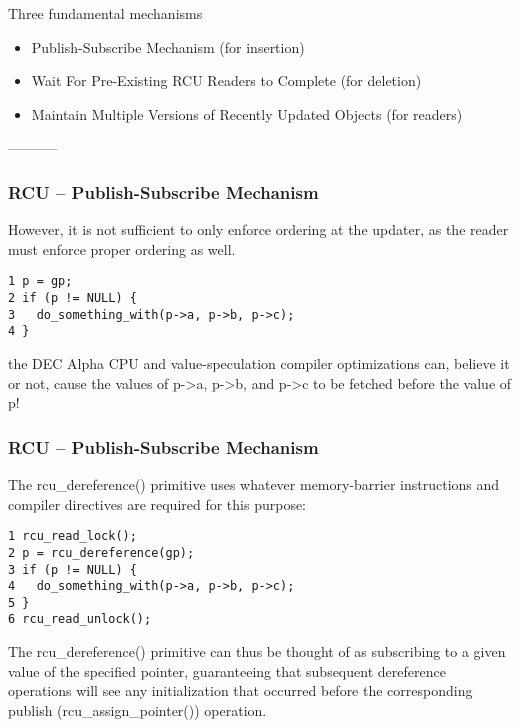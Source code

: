 Three fundamental mechanisms
\begin{itemize}
    \item  Publish-Subscribe Mechanism (for insertion) 
    \item  Wait For Pre-Existing RCU Readers to Complete (for deletion) 
    \item Maintain Multiple Versions of Recently Updated Objects (for readers) 
\end{itemize}-----------
\begin{frame}[fragile]
    \frametitle{RCU -- Publish-Subscribe Mechanism}
    \Large
    However, it is not sufficient to only enforce ordering at the updater, as the reader must enforce proper ordering as well.
    
    \small
    \begin{block}{}
        \begin{verbatim}
1 p = gp;
2 if (p != NULL) {
3   do_something_with(p->a, p->b, p->c);
4 }
        \end{verbatim}
    \end{block}  

\Large
the DEC Alpha CPU and value-speculation compiler optimizations can, believe it or not, cause the values of p->a, p->b, and p->c to be fetched before the value of p!
\end{frame}


\begin{frame}[fragile]
    \frametitle{RCU -- Publish-Subscribe Mechanism}
    \Large
    The rcu\_dereference() primitive uses whatever memory-barrier instructions and compiler directives are required for this purpose: 
    
    \small
    \begin{block}{}
        \begin{verbatim}
1 rcu_read_lock();
2 p = rcu_dereference(gp);
3 if (p != NULL) {
4   do_something_with(p->a, p->b, p->c);
5 }
6 rcu_read_unlock();
        \end{verbatim}
    \end{block}  
    
    \normalsize
The rcu\_dereference() primitive can thus be thought of as subscribing to a given value of the specified pointer, guaranteeing that subsequent dereference operations will see any initialization that occurred before the corresponding publish (rcu\_assign\_pointer()) operation. 
\end{frame}


